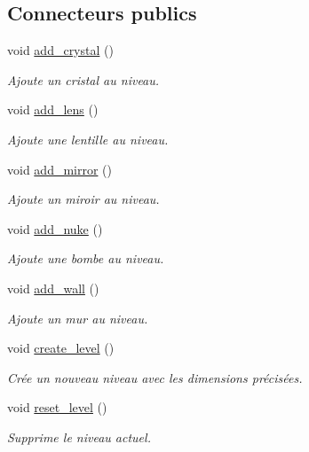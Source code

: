 \subsection*{Connecteurs publics}
\begin{DoxyCompactItemize}
\item 
void \hyperlink{classElements_a964576c05a5b9ec733a663474f8fd978}{add\+\_\+crystal} ()
\begin{DoxyCompactList}\small\item\em Ajoute un cristal au niveau. \end{DoxyCompactList}\item 
void \hyperlink{classElements_a8093eca3330566813da371aecc96530c}{add\+\_\+lens} ()
\begin{DoxyCompactList}\small\item\em Ajoute une lentille au niveau. \end{DoxyCompactList}\item 
void \hyperlink{classElements_a8d7a4e7ff0c84f105f0f0116425293a7}{add\+\_\+mirror} ()
\begin{DoxyCompactList}\small\item\em Ajoute un miroir au niveau. \end{DoxyCompactList}\item 
void \hyperlink{classElements_aa0884faf781bb26d6ca4dd8751b0eb32}{add\+\_\+nuke} ()
\begin{DoxyCompactList}\small\item\em Ajoute une bombe au niveau. \end{DoxyCompactList}\item 
void \hyperlink{classElements_ad4b05e8a07d9f6867035243c5e3f7572}{add\+\_\+wall} ()
\begin{DoxyCompactList}\small\item\em Ajoute un mur au niveau. \end{DoxyCompactList}\item 
\hypertarget{classElements_ad4bfaa4ea43fffd8653224165b5bbc29}{void \hyperlink{classElements_ad4bfaa4ea43fffd8653224165b5bbc29}{create\+\_\+level} ()}\label{classElements_ad4bfaa4ea43fffd8653224165b5bbc29}

\begin{DoxyCompactList}\small\item\em Crée un nouveau niveau avec les dimensions précisées. \end{DoxyCompactList}\item 
\hypertarget{classElements_a938cdaf6c97d1c9e5db80280b6379176}{void \hyperlink{classElements_a938cdaf6c97d1c9e5db80280b6379176}{reset\+\_\+level} ()}\label{classElements_a938cdaf6c97d1c9e5db80280b6379176}

\begin{DoxyCompactList}\small\item\em Supprime le niveau actuel. \end{DoxyCompactList}\end{DoxyCompactItemize}
